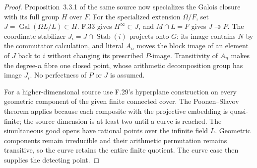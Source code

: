 \begin{proof}
Proposition~3.3.1 of the same source now specializes the
Galois closure with its full group $H$ over $F$. For the
specialized extension $\Omega/F$, set
$J=\operatorname{Gal}(\Omega L/L)\subset H$.
F.33 gives $H^\infty\subset J$, and $M\cap L=F$ gives
$J\twoheadrightarrow P$. The coordinate stabilizer
$J_i=J\cap\operatorname{Stab}(i)$ projects onto $G$:
its image contains $N$ by the commutator calculation, and
literal $A_n$ moves the block image of an element of $J$
back to $i$ without changing its prescribed $P$-image.
Transitivity of $A_n$ makes the degree-$n$ fibre one closed
point, whose arithmetic decomposition group has image $J_i$.
No perfectness of $P$ or $J$ is assumed.

For a higher-dimensional source use F.29's hyperplane
construction on every geometric component of the given finite
connected cover. The Poonen--Slavov theorem applies because
each composite with the projective embedding is quasi-finite;
the source dimension is at least two until a curve is reached.
The simultaneous good opens have rational points over the
infinite field $L$. Geometric components remain irreducible
and their arithmetic permutation remains transitive, so the
curve retains the entire finite quotient. The curve case
then supplies the detecting point.
\end{proof}

